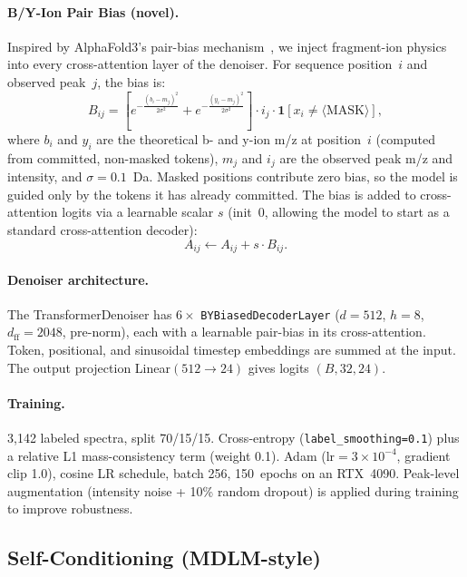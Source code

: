 \documentclass[11pt]{article}
\begin{document}
\paragraph{B/Y-Ion Pair Bias (novel).}
Inspired by AlphaFold3's pair-bias mechanism~\cite{instanovo}, we inject
fragment-ion physics into every cross-attention layer of the denoiser. For
sequence position~$i$ and observed peak~$j$, the bias is:
\begin{equation}
  B_{ij} = \left[
    e^{-\frac{(b_i - m_j)^2}{2\sigma^2}} +
    e^{-\frac{(y_i - m_j)^2}{2\sigma^2}}
  \right] \cdot i_j \cdot \mathbf{1}[x_i \neq \langle\text{MASK}\rangle],
\end{equation}
where $b_i$ and $y_i$ are the theoretical b- and y-ion m/z at position~$i$
(computed from committed, non-masked tokens), $m_j$ and $i_j$ are the observed
peak m/z and intensity, and $\sigma=0.1$~Da. Masked positions contribute zero
bias, so the model is guided only by the tokens it has already committed.
The bias is added to cross-attention logits via a learnable scalar $s$ (init~$0$,
allowing the model to start as a standard cross-attention decoder):
\begin{equation}
  A_{ij} \leftarrow A_{ij} + s \cdot B_{ij}.
\end{equation}

\paragraph{Denoiser architecture.}
The TransformerDenoiser has $6\times$ \texttt{BYBiasedDecoderLayer}
($d=512$, $h=8$, $d_\text{ff}=2048$, pre-norm), each with a learnable pair-bias
in its cross-attention. Token, positional, and sinusoidal timestep embeddings are
summed at the input. The output projection Linear$(512\!\to\!24)$ gives logits
$(B, 32, 24)$.

\paragraph{Training.}
3,142 labeled spectra, split 70/15/15. Cross-entropy (\texttt{label\_smoothing=0.1})
plus a relative L1 mass-consistency term (weight 0.1). Adam ($\text{lr}=3\times10^{-4}$,
gradient clip 1.0), cosine LR schedule, batch 256, 150~epochs on an RTX~4090.
Peak-level augmentation (intensity noise + 10\% random dropout) is applied during
training to improve robustness.

\subsection{Self-Conditioning (MDLM-style)}
\end{document}

